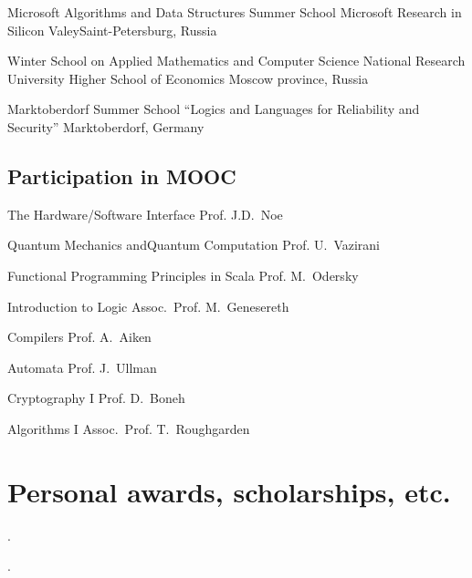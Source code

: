 \documentclass[11pt,a4paper]{moderncv}   %
\begin{document}
%
    {Microsoft Algorithms and Data Structures Summer School}%
    {Microsoft Research in Silicon Valey}{Saint-Petersburg, Russia}{}%
    {}

%
    {Winter School on Applied Mathematics and Computer Science}%
    {National Research University Higher School of Economics}%
    {Moscow province, Russia}{}%
    {}

%
    {Marktoberdorf Summer School “Logics and Languages for Reliability and Security”}%
    {}{Marktoberdorf, Germany}{}%
    {}


\subsection{Participation in MOOC}
	{The Hardware/Software Interface}
	{Prof. J.D.~Noe}{}{}
	{}

	{Quantum Mechanics andQuantum Computation}
	{Prof. U.~Vazirani}{}{}
	{}

	{Functional Programming Principles
in Scala}
	{Prof. M.~Odersky}{}{}
	{}

	{Introduction to Logic}
	{Assoc.~Prof. M.~Genesereth}{}{}
	{}

	{Compilers}
	{Prof. A.~Aiken}
	{}{}{}

	{Automata}
	{Prof. J.~Ullman}{}{}
	{}

	{Cryptography I}
	{Prof. D.~Boneh}{}{}
	{}

	{Algorithms I}
	{Assoc.~Prof. T.~Roughgarden}{}{}
	{}

\section{Personal awards, scholarships, etc.}
.


.
\end{document}
